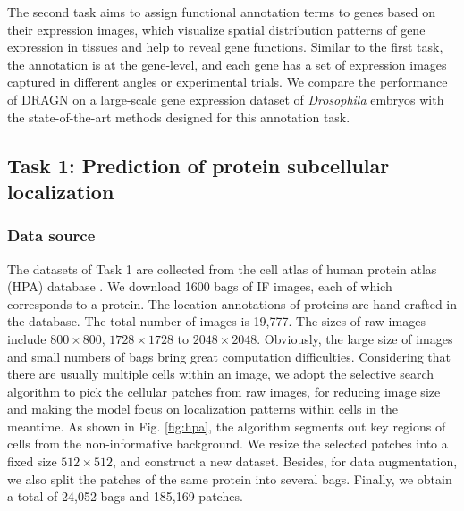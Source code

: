 \documentclass[10pt,twocolumn,letterpaper]{article}
\begin{document}
The second task aims to assign functional annotation terms to genes based on their expression images, which visualize spatial distribution patterns of gene expression in tissues and help to reveal gene functions. Similar to the first task, the annotation is at the gene-level, and each gene has a set of expression images captured in different angles or experimental trials. We compare the performance of DRAGN on a large-scale gene expression dataset of \emph{Drosophila} embryos with the state-of-the-art methods designed for this annotation task.

\subsection{Task 1: Prediction of protein subcellular localization}

\subsubsection{Data source}
The datasets of Task 1 are collected from the cell atlas of human protein atlas (HPA) database \cite{uhlen2010towards}. We download 1600 bags of IF images, each of which corresponds to a protein. The location annotations of proteins are hand-crafted in the database. The total number of images is 19,777. The sizes of raw images include $800\times 800$, $1728\times 1728$ to $2048\times 2048$. Obviously, the large size of images and small numbers of bags bring great computation difficulties. Considering that there are usually multiple cells within an image, we adopt the selective search algorithm \cite{uijlings2013selective} to pick the cellular patches from raw images, for reducing image size and making the model focus on localization patterns within cells in the meantime. As shown in Fig. \ref{fig:hpa}, the algorithm segments out key regions of cells from the non-informative background.
We resize the selected patches into a fixed size $512\times 512$, and construct a new dataset. Besides, for data augmentation, we also split the patches of the same protein into several bags. Finally, we obtain a total of 24,052 bags and 185,169 patches.
\end{document}
